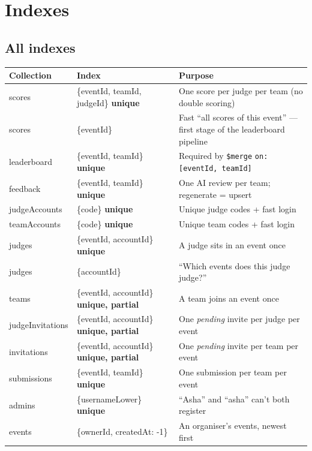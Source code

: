 \documentclass[11pt,a4paper]{article}
\newcommand{\op}[1]{\texttt{\$#1}}
\begin{document}
\section{Indexes}

\subsection{All indexes}
\begin{longtable}{@{}>{\ttfamily}p{3.1cm}>{\ttfamily}p{5.4cm}p{6.6cm}@{}}
\toprule
\normalfont\textbf{Collection} & \normalfont\textbf{Index} & \textbf{Purpose}\\
\midrule
\endhead
scores & \{eventId, teamId, judgeId\} \textbf{unique} & One score per judge per team (no double scoring) \\
scores & \{eventId\} & Fast ``all scores of this event'' --- first stage of the leaderboard pipeline \\
leaderboard & \{eventId, teamId\} \textbf{unique} & Required by \op{merge} \texttt{on: [eventId, teamId]} \\
feedback & \{eventId, teamId\} \textbf{unique} & One AI review per team; regenerate = upsert \\
judgeAccounts & \{code\} \textbf{unique} & Unique judge codes + fast login \\
teamAccounts & \{code\} \textbf{unique} & Unique team codes + fast login \\
judges & \{eventId, accountId\} \textbf{unique} & A judge sits in an event once \\
judges & \{accountId\} & ``Which events does this judge judge?'' \\
teams & \{eventId, accountId\} \textbf{unique, partial} & A team joins an event once \\
judgeInvitations & \{eventId, accountId\} \textbf{unique, partial} & One \emph{pending} invite per judge per event \\
invitations & \{eventId, accountId\} \textbf{unique, partial} & One \emph{pending} invite per team per event \\
submissions & \{eventId, teamId\} \textbf{unique} & One submission per team per event \\
admins & \{usernameLower\} \textbf{unique} & ``Asha'' and ``asha'' can't both register \\
events & \{ownerId, createdAt: -1\} & An organiser's events, newest first \\
\bottomrule
\end{longtable}
\end{document}
